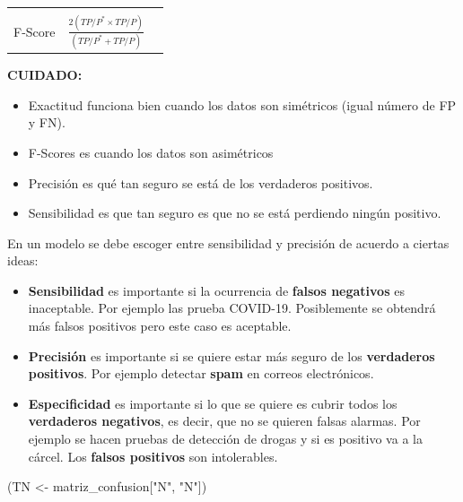 \documentclass[
  12pt,
]{book}
\newenvironment{Shaded}{\begin{snugshade}}{\end{snugshade}}
\newcommand{\NormalTok}[1]{#1}
\newcommand{\StringTok}[1]{\textcolor[rgb]{0.31,0.60,0.02}{#1}}
\providecommand{\tightlist}{%
  \setlength{\itemsep}{0pt}\setlength{\parskip}{0pt}}
\theoremstyle{definition}
\theoremstyle{definition}
\theoremstyle{definition}
\theoremstyle{remark}
\begin{document}
\begin{longtable}[]{@{}lll@{}}
\begin{minipage}[t]{0.39\columnwidth}
\strut
\end{minipage}\tabularnewline
\begin{minipage}[t]{0.19\columnwidth}\raggedright
F-Score\strut
\end{minipage} & \begin{minipage}[t]{0.33\columnwidth}\raggedright
\(\frac{2(TP/P^{*} \times TP/P )}{(TP/P^{*} + TP/P )}\)\strut
\end{minipage} & \begin{minipage}[t]{0.39\columnwidth}\raggedright
\strut
\end{minipage}\tabularnewline
\bottomrule
\end{longtable}

\textbf{CUIDADO:}

\begin{itemize}
\tightlist
\item
  Exactitud funciona bien cuando los datos son simétricos (igual número de FP y FN).
\item
  F-Scores es cuando los datos son asimétricos
\item
  Precisión es qué tan seguro se está de los verdaderos positivos.
\item
  Sensibilidad es que tan seguro es que no se está perdiendo ningún positivo.
\end{itemize}

En un modelo se debe escoger entre sensibilidad y precisión de acuerdo a ciertas ideas:

\begin{itemize}
\tightlist
\item
  \textbf{Sensibilidad} es importante si la ocurrencia de \textbf{falsos negativos} es inaceptable. Por ejemplo las prueba COVID-19. Posiblemente se obtendrá más falsos positivos pero este caso es aceptable.
\item
  \textbf{Precisión} es importante si se quiere estar más seguro de los \textbf{verdaderos positivos}. Por ejemplo detectar \textbf{spam} en correos electrónicos.
\item
  \textbf{Especificidad} es importante si lo que se quiere es cubrir todos los \textbf{verdaderos negativos}, es decir, que no se quieren falsas alarmas. Por ejemplo se hacen pruebas de detección de drogas y si es positivo va a la cárcel. Los \textbf{falsos positivos} son intolerables.
\end{itemize}

\begin{Shaded}
\begin{Highlighting}[]
\NormalTok{(TN <-}\StringTok{ }\NormalTok{matriz_confusion[}\StringTok{"N"}\NormalTok{, }\StringTok{"N"}\NormalTok{])}
\end{Highlighting}
\end{Shaded}
\end{document}
